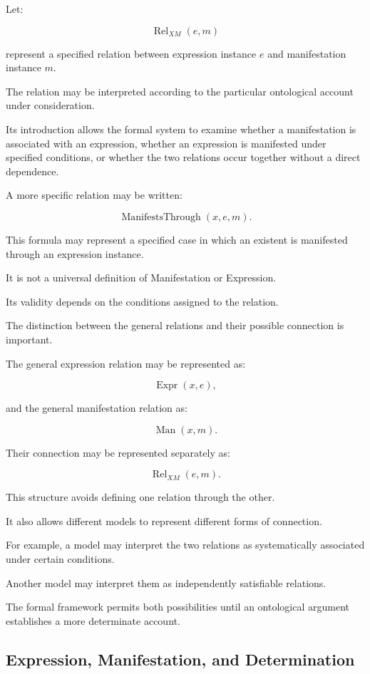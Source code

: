 Let:

\[
    \operatorname{Rel}_{XM}(e,m)
\]

represent a specified relation
between expression instance \(e\)
and manifestation instance \(m\).

The relation may be interpreted
according to the particular
ontological account under
consideration.

Its introduction allows the
formal system to examine
whether a manifestation is
associated with an expression,
whether an expression is
manifested under specified
conditions, or whether the
two relations occur together
without a direct dependence.

A more specific relation may
be written:

\[
    \operatorname{ManifestsThrough}(x,e,m).
\]

This formula may represent
a specified case in which
an existent is manifested
through an expression instance.

It is not a universal definition
of Manifestation or Expression.

Its validity depends on the
conditions assigned to the
relation.

The distinction between the
general relations and their
possible connection is important.

The general expression relation
may be represented as:

\[
    \operatorname{Expr}(x,e),
\]

and the general manifestation
relation as:

\[
    \operatorname{Man}(x,m).
\]

Their connection may be represented
separately as:

\[
    \operatorname{Rel}_{XM}(e,m).
\]

This structure avoids defining
one relation through the other.

It also allows different models
to represent different forms
of connection.

For example, a model may
interpret the two relations
as systematically associated
under certain conditions.

Another model may interpret
them as independently satisfiable
relations.

The formal framework permits
both possibilities until an
ontological argument establishes
a more determinate account.

\subsection{Expression, Manifestation, and Determination}

